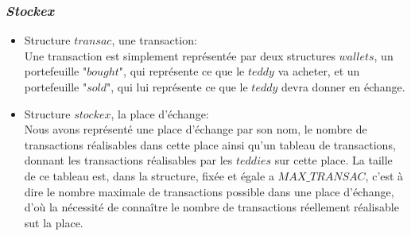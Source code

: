 \documentclass{article}
\begin{document}
    \subsubsection{\textit{Stockex}}
    \begin{itemize}
    \item Structure $transac$, une transaction:\\
    Une transaction est simplement représentée par deux structures $wallets$, un portefeuille "$bought$", qui représente ce que le $teddy$ va acheter, et un portefeuille "$sold$", qui lui représente ce que le $teddy$ devra donner en échange.\\
    \item Structure $stockex$, la place d'échange:\\
    Nous avons représenté une place d'échange par son nom, le nombre de transactions réalisables dans cette place ainsi qu'un tableau de transactions, donnant les transactions réalisables par les $teddies$ sur cette place. La taille de ce tableau est, dans la structure, fixée et égale a $MAX\_TRANSAC$, c'est à dire le nombre maximale de transactions possible dans une place d'échange, d'où la nécessité de connaître le nombre de transactions réellement réalisable sut la place.  
    \end{itemize}
    
\end{document}
